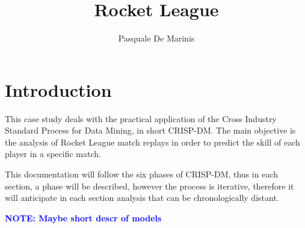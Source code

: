 \documentclass[
	12pt, %
]{fphw}
\title{Rocket League}
\author{Pasquale De Marinis}
\institute{University of Bari \\ Department of Computer Science} %
\newcommand{\note}[1]{\textbf{\textcolor{blue}{{NOTE: #1}}}}
\begin{document}
\maketitle
\tableofcontents\newpage

\section{Introduction}

This case study deals with the practical application of the Cross Industry Standard Process for Data Mining, in short CRISP-DM. The main objective is the analysis of Rocket League match replays in order to predict the skill of each player in a specific match.

This documentation will follow the six phases of CRISP-DM, thus in each section, a phase will be described, however the process is iterative, therefore it will anticipate in each section analysis that can be chronologically distant.





\note{Maybe short descr of models}

\newpage

\end{document}
